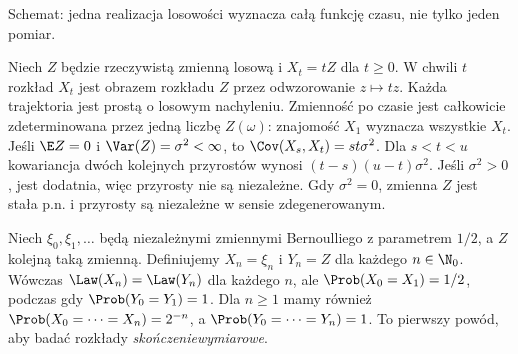 \begin{center}
\par\smallskip\small Schemat: jedna realizacja losowości wyznacza całą funkcję czasu, nie tylko jeden pomiar.
\end{center}

\begin{przyklad}
Niech $Z$ będzie rzeczywistą zmienną losową i $X_t=tZ$ dla $t\ge0$.
W chwili $t$ rozkład $X_t$ jest obrazem rozkładu $Z$ przez
odwzorowanie $z\mapsto tz$. Każda trajektoria jest prostą o losowym
nachyleniu. Zmienność po czasie jest całkowicie zdeterminowana przez
jedną liczbę $Z(\omega)$: znajomość $X_1$ wyznacza wszystkie $X_t$.
Jeśli $\E Z=0$ i $\Var(Z)=\sigma^2<\infty$, to
$\Cov(X_s,X_t)=st\sigma^2$. Dla $s<t<u$
kowariancja dwóch kolejnych przyrostów wynosi
$(t-s)(u-t)\sigma^2$. Jeśli $\sigma^2>0$, jest dodatnia,
więc przyrosty nie są niezależne. Gdy $\sigma^2=0$,
zmienna $Z$ jest stała p.n. i przyrosty są niezależne
w sensie zdegenerowanym.
\end{przyklad}

\begin{przyklad}
Niech $\xi_0,\xi_1,\ldots$ będą niezależnymi zmiennymi Bernoulliego
z parametrem $1/2$, a $Z$ kolejną taką zmienną. Definiujemy
$X_n=\xi_n$ i $Y_n=Z$ dla każdego $n\in\N_0$.
Wówczas $\Law(X_n)=\Law(Y_n)$ dla każdego $n$, ale
$\Prob(X_0=X_1)=1/2$, podczas gdy $\Prob(Y_0=Y_1)=1$.
Dla $n\ge1$ mamy również
$\Prob(X_0=\cdots=X_n)=2^{-n}$,
a $\Prob(Y_0=\cdots=Y_n)=1$.
To pierwszy powód, aby badać rozkłady \emph{skończeniewymiarowe}.
\end{przyklad}

